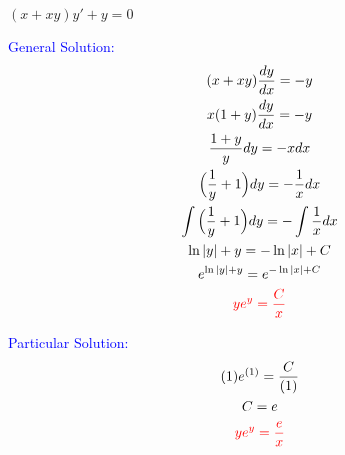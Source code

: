 \item $(x + xy)y' + y = 0$

\textcolor{blue}{
    \begin{minipage}[t]{0.45\textwidth}
        General Solution:
        \begin{gather*}
        (x + xy)\frac{dy}{dx}= -y\\
        x(1 + y)\frac{dy}{dx}= -y\\
        \frac{1 + y}{y}dy= -xdx\\
        \Big(\frac{1}{y}+1\Big)dy= -\frac{1}{x}dx\\
        \int \Big(\frac{1}{y}+1\Big)dy= -\int \frac{1}{x}dx\\
        \ln|y| + y = -\ln|x|+C \\
        e^{\ln|y| + y} = e^{-\ln|x|+C} \\
        \textcolor{red}{
        ye^y=\frac{C}{x}
        }
        \end{gather*}
    \end{minipage}
    \hfill
    \begin{minipage}[t]{0.45\textwidth}
        Particular Solution:
        \begin{gather*}
        (1)e^{(1)}=\frac{C}{(1)}\\
        C=e\\
        \textcolor{red}{
        ye^y=\frac{e}{x}
        }
        \end{gather*}
    \end{minipage}
}